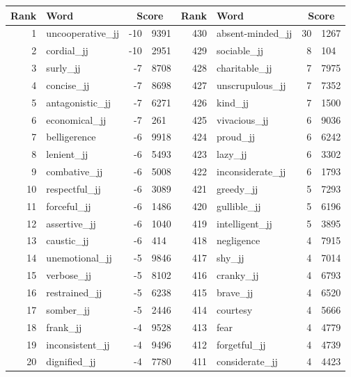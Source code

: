 \begin{table}[tbp]
    \begin{tabular}{| rlr@{.}l | rlr@{.}l |}
    \hline
    \textbf{Rank} & \textbf{Word} & \multicolumn{2}{c|}{\textbf{Score}} & \textbf{Rank} & \textbf{Word} & \multicolumn{2}{c|}{\textbf{Score}} \\
    \hline
    1 & uncooperative\_jj & -10 & 9391    &    430 & absent-minded\_jj & 30 & 1267 \\
    2 & cordial\_jj & -10 & 2951    &    429 & sociable\_jj & 8 & 104 \\
    3 & surly\_jj & -7 & 8708    &    428 & charitable\_jj & 7 & 7975 \\
    4 & concise\_jj & -7 & 8698    &    427 & unscrupulous\_jj & 7 & 7352 \\
    5 & antagonistic\_jj & -7 & 6271    &    426 & kind\_jj & 7 & 1500 \\
    6 & economical\_jj & -7 & 261    &    425 & vivacious\_jj & 6 & 9036 \\
    7 & belligerence & -6 & 9918    &    424 & proud\_jj & 6 & 6242 \\
    8 & lenient\_jj & -6 & 5493    &    423 & lazy\_jj & 6 & 3302 \\
    9 & combative\_jj & -6 & 5008    &    422 & inconsiderate\_jj & 6 & 1793 \\
    10 & respectful\_jj & -6 & 3089    &    421 & greedy\_jj & 5 & 7293 \\
    11 & forceful\_jj & -6 & 1486    &    420 & gullible\_jj & 5 & 6196 \\
    12 & assertive\_jj & -6 & 1040    &    419 & intelligent\_jj & 5 & 3895 \\
    13 & caustic\_jj & -6 & 414    &    418 & negligence & 4 & 7915 \\
    14 & unemotional\_jj & -5 & 9846    &    417 & shy\_jj & 4 & 7014 \\
    15 & verbose\_jj & -5 & 8102    &    416 & cranky\_jj & 4 & 6793 \\
    16 & restrained\_jj & -5 & 6238    &    415 & brave\_jj & 4 & 6520 \\
    17 & somber\_jj & -5 & 2446    &    414 & courtesy & 4 & 5666 \\
    18 & frank\_jj & -4 & 9528    &    413 & fear & 4 & 4779 \\
    19 & inconsistent\_jj & -4 & 9496    &    412 & forgetful\_jj & 4 & 4739 \\
    20 & dignified\_jj & -4 & 7780    &    411 & considerate\_jj & 4 & 4423 \\

\end{tabular}
\end{table}
